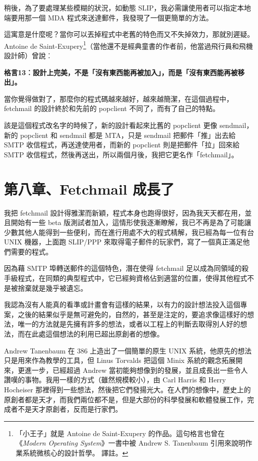 \documentclass[12pt,]{article}
\makeatletter
\newcommand*{\shifttext}[2]{%
  \settowidth{\@tempdima}{#2}%
  \makebox[\@tempdima]{\hspace*{#1}#2}%
}
\makeatother
\begin{document}
稍後，為了要處理某些模糊的狀況，如動態
SLIP，我必需讓使用者可以指定本地端要用那一個 MDA
程式來送達郵件，我發現了一個更簡單的方法。

這寓意是什麼呢？當你可以丟掉程式中老舊的特色而又不失掉效力，那就別遲疑。Antoine
de Saint-Exupery\footnote{「小王子」就是 Antoine de Saint-Exupery
  的作品。這句格言也曾在《\emph{Modern Operating System}》一書中被
  Andrew S. Tanenbaum 引用來說明作業系統微核心的設計哲學。 \shifttext{1pt}{---}\shifttext{-1pt}{---} 譯註。}（當他還不是經典童書的作者前，他當過飛行員和飛機設計師）曾說︰

\textbf{格言13︰設計上完美，不是「沒有東西能再被加入」，而是「沒有東西能再被移出」。}

當你覺得做對了，那麼你的程式碼越來越好，越來越簡潔，在這個過程中，fetchmail
的設計終於和先前的 popclient 不同了，而有了自己的特點。

該是這個程式改名字的時候了，新的設計看起來比舊的 popclient 更像
sendmail，新的 popclient 和 sendmail 都是 MTA，只是 sendmail
把郵件「推」出去給 SMTP 收信程式，再送達使用者，而新的 popclient
則是把郵件「拉」回來給 SMTP
收信程式，然後再送出，所以兩個月後，我把它更名作「fetchmail」。

\newpage
\section{第八章、Fetchmail 成長了}

我把 fetchmail
設計得雅潔而新穎，程式本身也跑得很好，因為我天天都在用，並且開始有一些 beta
版測試者加入，這情形使我逐漸瞭解，我已不再是為了可能讓少數其他人能得到一些便利，而在進行用處不大的程式棈解，我已經為每一位有台
UNIX 機器，上面跑 SLIP/PPP
來取得電子郵件的玩家們，寫了一個真正滿足他們需要的程式。

因為藉 SMTP 埠轉送郵件的這個特色，潛在使得 fetchmail
足以成為同領域的殺手級程式，在同類的典型程式中，它已經夠資格佔到適當的位置，使得其他程式不是被捨棄就是幾乎被遺忘。

我認為沒有人能真的看準或計畫會有這樣的結果，以有力的設計想法投入這個專案，之後的結果似乎是無可避免的，自然的，甚至是注定的，要追求像這樣好的想法，唯一的方法就是先擁有許多的想法，或者以工程上的判斷去取得別人好的想法，而在此處這個想法的利用已超出原創者的想像。

Andrew Tanenbaum 在 386 上造出了一個簡單的原生 UNIX
系統，他原先的想法只是用來作為教學的工具，但 Linus Torvalds 把這個 Minix
系統的觀念拓展開來，更進一步，已經超過 Andrew
當初能夠想像到的發展，並且成長出一些令人讚嘆的事物。我用一樣的方式（雖然規模較小），由
Carl Harris 和 Herry Hocheiser
那裡得到一些想法，然後把它們發揚光大。在人們的想像中，歷史上的原創者都是天才，而我們兩位都不是，但是大部份的科學發展和軟體發展工作，完成者不是天才原創者，反而是行家們。
\end{document}
